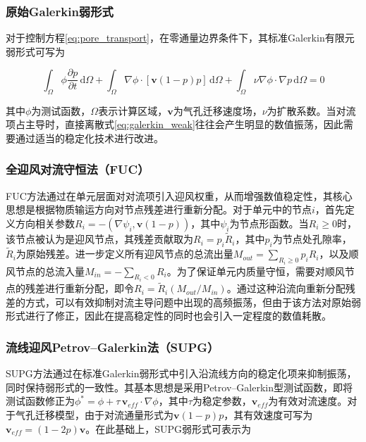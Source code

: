 \subsubsection{原始Galerkin弱形式}

对于控制方程\eqref{eq:pore_transport}，在零通量边界条件下，其标准Galerkin有限元弱形式可写为

\begin{equation}
	\int_\Omega
	\phi
	\frac{\partial p}{\partial t}
	\,\mathrm d\Omega
	+
	\int_\Omega
	\nabla \phi
	\cdot
	[\mathbf{v}(1-p)p]
	\,\mathrm d\Omega
	+
	\int_\Omega
	\nu
	\nabla \phi
	\cdot
	\nabla p
	\,\mathrm d\Omega
	=0 
	\label{eq:galerkin_weak}
\end{equation}

其中$\phi$为测试函数，$\Omega$表示计算区域，$\mathbf v$为气孔迁移速度场，$\nu$为扩散系数。当对流项占主导时，直接离散式\eqref{eq:galerkin_weak}往往会产生明显的数值振荡，因此需要通过适当的稳定化技术进行改进。

\subsubsection{全迎风对流守恒法（FUC）}

FUC方法\cite{adhikaryAnalysisFiniteElement2011}通过在单元层面对对流项引入迎风权重，从而增强数值稳定性，其核心思想是根据物质输运方向对节点残差进行重新分配。对于单元中的节点$i$，首先定义方向相关参数$R_i=-(\nabla\psi_i,\mathbf v(1-p))$，其中$\psi_i$为节点形函数。当$R_i\ge0$时，该节点被认为是迎风节点，其残差贡献取为$R_i=p_i\tilde R_i$，其中$p_i$为节点处孔隙率，$\tilde R_i$为原始残差。进一步定义所有迎风节点的总流出量$M_{out}=\sum_{R_i\ge0}p_iR_i$，以及顺风节点的总流入量$M_{in}=-\sum_{R_i<0}R_i$。为了保证单元内质量守恒，需要对顺风节点的残差进行重新分配，即令$R_i=\tilde R_i(M_{out}/M_{in})$。通过这种沿流向重新分配残差的方式，可以有效抑制对流主导问题中出现的高频振荡，但由于该方法对原始弱形式进行了修正，因此在提高稳定性的同时也会引入一定程度的数值耗散。

\subsubsection{流线迎风Petrov--Galerkin法（SUPG）}

SUPG方法\cite{brooksStreamlineUpwindPetrovgalerkin1982,johnsonFiniteElementMethods1984}通过在标准Galerkin弱形式中引入沿流线方向的稳定化项来抑制振荡，同时保持弱形式的一致性。其基本思想是采用Petrov--Galerkin型测试函数，即将测试函数修正为$\phi^*=\phi+\tau\,\mathbf v_{eff}\cdot\nabla\phi$，其中$\tau$为稳定参数，$\mathbf v_{eff}$为有效对流速度。对于气孔迁移模型，由于对流通量形式为$\mathbf v(1-p)p$，其有效速度可写为$\mathbf v_{eff}=(1-2p)\mathbf v$。在此基础上，SUPG弱形式可表示为

